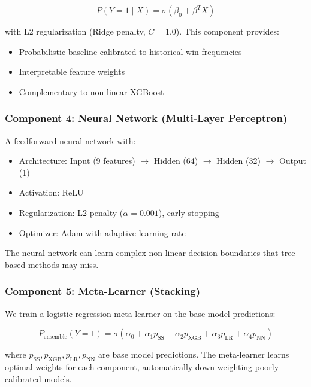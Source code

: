 \begin{equation}
P(Y = 1 \mid X) = \sigma(\beta_0 + \beta^T X)
\end{equation}

with L2 regularization (Ridge penalty, $C = 1.0$). This component provides:

\begin{itemize}
    \item Probabilistic baseline calibrated to historical win frequencies
    \item Interpretable feature weights
    \item Complementary to non-linear XGBoost
\end{itemize}

\subsubsection{Component 4: Neural Network (Multi-Layer Perceptron)}

A feedforward neural network with:
\begin{itemize}
    \item Architecture: Input (9 features) $\to$ Hidden (64) $\to$ Hidden (32) $\to$ Output (1)
    \item Activation: ReLU
    \item Regularization: L2 penalty ($\alpha = 0.001$), early stopping
    \item Optimizer: Adam with adaptive learning rate
\end{itemize}

The neural network can learn complex non-linear decision boundaries that tree-based methods may miss.

\subsubsection{Component 5: Meta-Learner (Stacking)}

We train a logistic regression meta-learner on the base model predictions:

\begin{equation}
P_{\text{ensemble}}(Y = 1) = \sigma(\alpha_0 + \alpha_1 p_{\text{SS}} + \alpha_2 p_{\text{XGB}} + \alpha_3 p_{\text{LR}} + \alpha_4 p_{\text{NN}})
\label{eq:meta-learner}
\end{equation}

where $p_{\text{SS}}, p_{\text{XGB}}, p_{\text{LR}}, p_{\text{NN}}$ are base model predictions. The meta-learner learns optimal weights for each component, automatically down-weighting poorly calibrated models.

